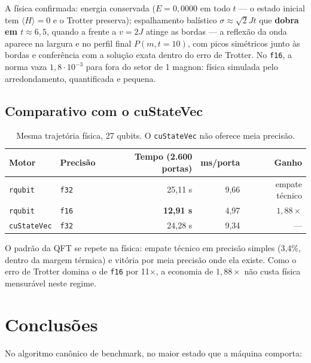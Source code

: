 \documentclass[11pt,a4paper]{article}
\begin{document}
A física confirmada: energia conservada ($E = 0{,}0000$ em todo $t$ --- o
estado inicial tem $\langle H\rangle = 0$ e o Trotter preserva); espalhamento
balístico $\sigma \approx \sqrt{2}Jt$ que \textbf{dobra em $t \approx 6{,}5$},
quando a frente a $v = 2J$ atinge as bordas --- a reflexão da onda aparece na
largura e no perfil final $P(m, t=10)$, com picos simétricos junto às bordas e
conferência com a solução exata dentro do erro de Trotter. No
\texttt{f16}, a norma vaza $1{,}8\cdot10^{-3}$ para fora do setor de 1
magnon: física simulada pelo arredondamento, quantificada e pequena.

\subsection{Comparativo com o cuStateVec}

\begin{table}[h]
\centering
\begin{tabular}{llrrr}
\toprule
Motor & Precisão & Tempo (2.600 portas) & ms/porta & Ganho \\
\midrule
\texttt{rqubit} & \texttt{f32} & 25,11 s & 9,66 & empate técnico \\
\texttt{rqubit} & \texttt{f16} & \textbf{12,91 s} & 4,97 & $1{,}88\times$ \\
\texttt{cuStateVec} & \texttt{f32} & 24,28 s & 9,34 & --- \\
\bottomrule
\end{tabular}
\caption{Mesma trajetória física, 27 qubits. O \texttt{cuStateVec} não
oferece meia precisão.}
\end{table}

O padrão da QFT se repete na física: empate técnico em precisão simples
(3,4\%, dentro da margem térmica) e vitória por meia precisão onde ela existe.
Como o erro de Trotter domina o de \texttt{f16} por 11$\times$, a economia de
$1{,}88\times$ não custa física mensurável neste regime.

\section{Conclusões}

No algoritmo canônico de benchmark, no maior estado que a máquina comporta:
\end{document}
